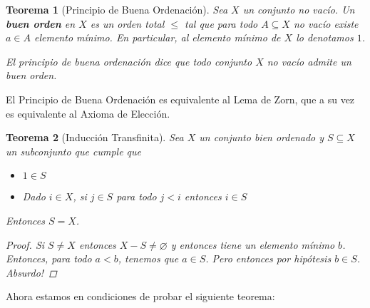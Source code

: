 \documentclass[12pt]{book}
\newtheorem{teo}{Teorema}[section]
\theoremstyle{definition}
\let\emptyset\varnothing
\begin{document}
\begin{teo}[Principio de Buena Ordenación]
Sea $X$ un conjunto no vacío. Un \textbf{buen orden} en $X$ es un orden total $\leq$ tal que para todo $A\subseteq X$ no vacío existe $a\in A$ elemento mínimo. En particular, al elemento mínimo de $X$ lo denotamos $1$.

El principio de buena ordenación dice que todo conjunto $X$ no vacío admite un buen orden.
\end{teo}

El Principio de Buena Ordenación es equivalente al Lema de Zorn, que a su vez es equivalente al Axioma de Elección.

\begin{teo}[Inducción Transfinita]
Sea $X$ un conjunto bien ordenado y $S\subseteq X$ un subconjunto que cumple que \begin{itemize} \item $1\in S$ \item Dado $i\in X$, si $j\in S$ para todo $j<i$ entonces $i\in S$\end{itemize} Entonces $S=X$.
\begin{proof}
Si $S\neq X$ entonces $X-S\neq \emptyset$ y entonces tiene un elemento mínimo $b$. Entonces, para todo $a< b$, tenemos que $a\in S$. Pero entonces por hipótesis $b\in S$. Absurdo!
\end{proof}
\end{teo}

Ahora estamos en condiciones de probar el siguiente teorema:
\end{document}
